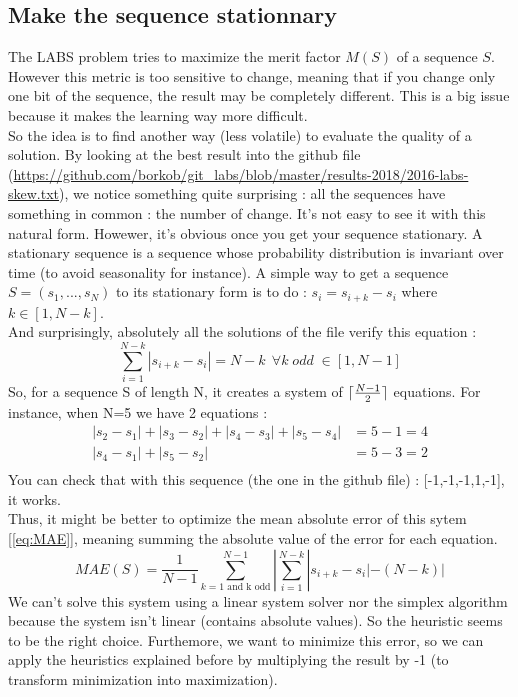 \documentclass[a4paper,11pt,openany]{article}
\DeclarePairedDelimiter{\ceil}{\lceil}{\rceil}
\begin{document}
\subsection{Make the sequence stationnary}
\noindent
The LABS problem tries to maximize the merit factor $M(S)$ of a sequence $S$. However this metric is too sensitive to change, meaning that if you change only one bit of the sequence, the result may be completely different. This is a big issue because it makes the learning way more difficult.\\
So the idea is to find another way (less volatile) to evaluate the quality of a solution. By looking at the best result into the github file (\url{https://github.com/borkob/git_labs/blob/master/results-2018/2016-labs-skew.txt}), we notice something quite surprising : all the sequences have something in common : the number of change. It's not easy to see it with this natural form. Howewer, it's obvious once you get your sequence stationary. A stationary sequence is a sequence whose probability distribution is invariant over time (to avoid seasonality for instance). A simple way to get a sequence $S=(s_1,...,s_N)$ to its stationary form is to do : $s_i=s_{i+k}-s_i$ where $k\in [1,N-k]$.\\
And surprisingly, absolutely all the solutions of the file verify this equation :
\begin{equation}
\sum_{i=1}^{N-k} |s_{i+k}-s_{i}|=N-k \;\, \forall k \; odd\; \in [1,N-1]
\end{equation}
So, for a sequence S of length N, it creates a system of $\ceil{\frac{N-1}{2}}$ equations. For instance, when N=5 we have 2 equations :
\begin{equation}
\begin{split}
|s_2-s_1|+|s_3-s_2|+|s_4-s_3|+|s_5-s_4|&=5-1=4\\
|s_4-s_1|+|s_5-s_2|&=5-3=2\\
\end{split}
\end{equation}
You can check that with this sequence (the one in the github file) : [-1,-1,-1,1,-1], it works.\\
Thus, it might be better to optimize the mean absolute error of this sytem [\ref{eq:MAE}], meaning summing the absolute value of the error for each equation.
\begin{equation}
\label{eq:MAE}
MAE(S)=\frac{1}{N-1}\sum_{k=1 \text{ and k odd}}^{N-1}|\sum_{i=1}^{N-k} |s_{i+k}-s_{i}|-(N-k)|
\end{equation}
We can't solve this system using a linear system solver nor the simplex algorithm because the system isn't linear (contains absolute values). So the heuristic seems to be the right choice.
Furthemore, we want to minimize this error, so we can apply the heuristics explained before by multiplying the result by -1 (to transform minimization into maximization).\\
\end{document}
